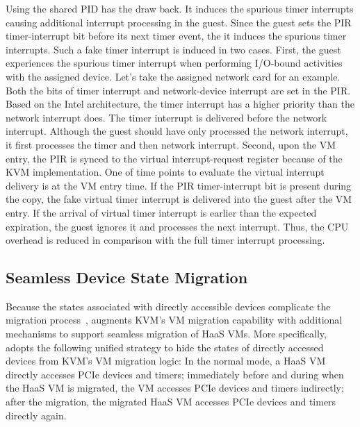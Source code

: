 {Using the shared PID has the draw back. It induces the
spurious timer interrupts causing additional interrupt
processing in the guest. Since the guest sets the PIR
timer-interrupt bit before its next timer event, the it
induces the spurious timer interrupts. Such a fake timer
interrupt is induced in two cases. First, the guest
experiences the spurious timer interrupt when performing
I/O-bound activities with the assigned device. Let's take the
assigned network card for an example. Both the bits of timer
interrupt and network-device interrupt are set in the PIR.
Based on the Intel architecture, the timer interrupt has a
higher priority than the network interrupt does. The timer
interrupt is delivered before the network interrupt. Although
the guest should have only processed the network interrupt, it
first processes the timer and then network interrupt. Second,
upon the VM entry, the PIR is synced to the virtual
interrupt-request register because of the KVM implementation.
One of time points to evaluate the virtual interrupt delivery
is at the VM entry time. If the PIR timer-interrupt bit is
present during the copy, the fake virtual timer interrupt is
delivered into the guest after the VM entry. If the arrival of
virtual timer interrupt is earlier than the expected
expiration, the guest ignores it and processes the next
interrupt. Thus, the CPU overhead is reduced in comparison
with the full timer interrupt processing. 

}
\subsection{Seamless Device State Migration}

Because the states associated with directly accessible devices complicate the migration process~\cite{zhai:2008}, 
\na augments KVM's VM migration capability with additional mechanisms to support seamless migration of HaaS VMs. 
More specifically, \na adopts the following unified strategy to hide the states of directly accessed devices from KVM's VM migration logic:
In the normal mode, a HaaS VM directly accesses PCIe devices and timers; immediately before and during when the HaaS VM is migrated,  the VM 
accesses PCIe devices and timers indirectly; after the migration, the migrated HaaS VM accesses PCIe devices and timers directly again.

